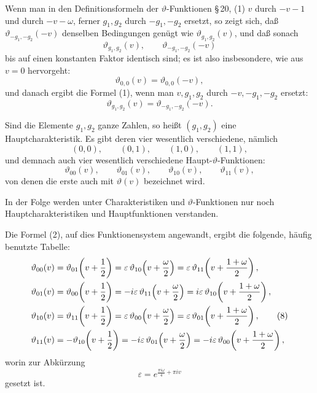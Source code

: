 \documentclass[11pt]{article}
\providecommand{\eps}{\varepsilon}
\begin{document}
Wenn man in den Definitionsformeln der $\vartheta$-Funktionen \S\,20, (1) $v$ durch $-v-1$ und durch $-v-\omega$, ferner $g_1,g_2$ durch $-g_1,-g_2$ ersetzt, so zeigt sich, daß $\vartheta_{-g_1,-g_2}(-v)$ denselben Bedingungen genügt wie $\vartheta_{g_1,g_2}(v)$, und daß sonach
\[
\vartheta_{g_1,g_2}(v),\qquad \vartheta_{-g_1,-g_2}(-v)
\]
bis auf einen konstanten Faktor identisch sind; es ist also insbesondere, wie aus $v=0$ hervorgeht:
\[
\vartheta_{0,0}(v)=\vartheta_{0,0}(-v),
\]
und danach ergibt die Formel (1), wenn man $v,g_1,g_2$ durch $-v,-g_1,-g_2$ ersetzt:
\begin{equation}
\vartheta_{g_1,g_2}(v)=\vartheta_{-g_1,-g_2}(-v).
\tag{6}
\end{equation}

Sind die Elemente $g_1,g_2$ ganze Zahlen, so heißt $(g_1,g_2)$ eine Hauptcharakteristik. Es gibt deren vier wesentlich verschiedene, nämlich
\[
(0,0),\qquad (0,1),\qquad (1,0),\qquad (1,1),
\]
und demnach auch vier wesentlich verschiedene Haupt-$\vartheta$-Funktionen:
\begin{equation}
\vartheta_{00}(v),\qquad \vartheta_{01}(v),\qquad \vartheta_{10}(v),\qquad \vartheta_{11}(v),
\tag{7}
\end{equation}
von denen die erste auch mit $\vartheta(v)$ bezeichnet wird.

In der Folge werden unter Charakteristiken und $\vartheta$-Funktionen nur noch Hauptcharakteristiken und Hauptfunktionen verstanden.

Die Formel (2), auf dies Funktionensystem angewandt, ergibt die folgende, häufig benutzte Tabelle:
\begin{align}
\vartheta_{00}(v)&=\vartheta_{01}\!\left(v+\frac12\right)=\eps\,\vartheta_{10}\!\left(v+\frac{\omega}{2}\right)=\eps\,\vartheta_{11}\!\left(v+\frac{1+\omega}{2}\right),\notag\\
\vartheta_{01}(v)&=\vartheta_{00}\!\left(v+\frac12\right)=-i\eps\,\vartheta_{11}\!\left(v+\frac{\omega}{2}\right)=i\eps\,\vartheta_{10}\!\left(v+\frac{1+\omega}{2}\right),\notag\\
\vartheta_{10}(v)&=\vartheta_{11}\!\left(v+\frac12\right)=\eps\,\vartheta_{00}\!\left(v+\frac{\omega}{2}\right)=\eps\,\vartheta_{01}\!\left(v+\frac{1+\omega}{2}\right),\tag{8}\\
\vartheta_{11}(v)&=-\vartheta_{10}\!\left(v+\frac12\right)=-i\eps\,\vartheta_{01}\!\left(v+\frac{\omega}{2}\right)=-i\eps\,\vartheta_{00}\!\left(v+\frac{1+\omega}{2}\right),
\notag
\end{align}
worin zur Abkürzung
\[
\eps=e^{\frac{\pi i\omega}{4}+\pi i v}
\]
gesetzt ist.
\end{document}
